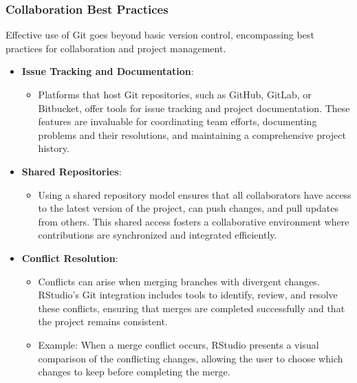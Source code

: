 \documentclass[
]{book}
\providecommand{\tightlist}{%
  \setlength{\itemsep}{0pt}\setlength{\parskip}{0pt}}
\begin{document}
\hypertarget{collaboration-best-practices}{%
\subsubsection{Collaboration Best Practices}\label{collaboration-best-practices}}

Effective use of Git goes beyond basic version control, encompassing best practices for collaboration and project management.

\begin{itemize}
\tightlist
\item
  \textbf{Issue Tracking and Documentation}:

  \begin{itemize}
  \tightlist
  \item
    Platforms that host Git repositories, such as GitHub, GitLab, or Bitbucket, offer tools for issue tracking and project documentation. These features are invaluable for coordinating team efforts, documenting problems and their resolutions, and maintaining a comprehensive project history.
  \end{itemize}
\item
  \textbf{Shared Repositories}:

  \begin{itemize}
  \tightlist
  \item
    Using a shared repository model ensures that all collaborators have access to the latest version of the project, can push changes, and pull updates from others. This shared access fosters a collaborative environment where contributions are synchronized and integrated efficiently.
  \end{itemize}
\item
  \textbf{Conflict Resolution}:

  \begin{itemize}
  \tightlist
  \item
    Conflicts can arise when merging branches with divergent changes. RStudio's Git integration includes tools to identify, review, and resolve these conflicts, ensuring that merges are completed successfully and that the project remains consistent.
  \item
    Example: When a merge conflict occurs, RStudio presents a visual comparison of the conflicting changes, allowing the user to choose which changes to keep before completing the merge.
  \end{itemize}
\end{itemize}
\end{document}
